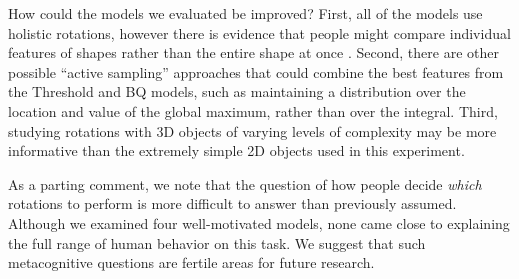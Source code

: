 \documentclass[10pt,letterpaper]{article}
\newcommand{\Th}[0]{Threshold}
\newcommand{\Bq}[0]{BQ}
\begin{document}
How could the models we evaluated be improved? First, all of the
models use holistic rotations, however there is evidence that people
might compare individual features of shapes rather than the entire
shape at once \cite{Just1976,Yuille:1982tx}. Second, there are other
possible ``active sampling'' approaches that could combine the best
features from the \Th{} and \Bq{} models, such as maintaining a
distribution over the location and value of the global maximum, rather
than over the integral. Third, studying rotations with 3D objects of
varying levels of complexity may be more informative than the
extremely simple 2D objects used in this experiment.

As a parting comment, we note that the question of how people decide
\textit{which} rotations to perform is more difficult to answer than
previously assumed. Although we examined four well-motivated models,
none came close to explaining the full range of human behavior on this
task. We suggest that such metacognitive questions are fertile areas
for future research.




\renewcommand{\bibliographytypesize}{\small}
\setlength{\bibleftmargin}{.125in}
\setlength{\bibindent}{-\bibleftmargin}

\end{document}
